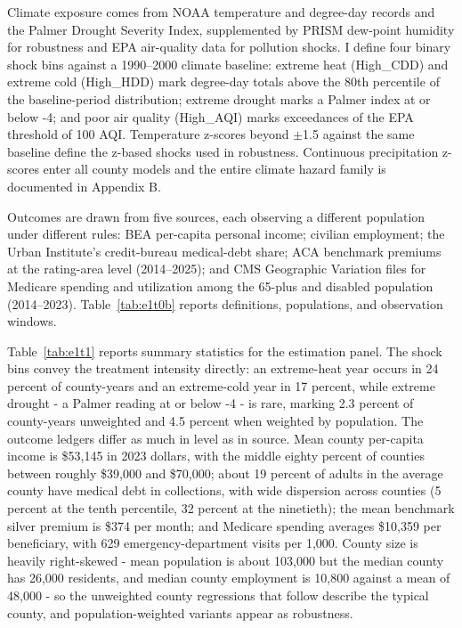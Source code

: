 \documentclass[a4paper,11pt]{article}
\begin{document}


Climate exposure comes from NOAA temperature and degree-day records and the Palmer Drought Severity Index, supplemented by PRISM dew-point humidity for robustness and EPA air-quality data for pollution shocks. I define four binary shock bins against a 1990--2000 climate baseline: extreme heat (High\_CDD) and extreme cold (High\_HDD) mark degree-day totals above the 80th percentile of the baseline-period distribution; extreme drought marks a Palmer index at or below -4; and poor air quality (High\_AQI) marks exceedances of the EPA threshold of 100 AQI. Temperature z-scores beyond $\pm$1.5 against the same baseline define the z-based shocks used in robustness. Continuous precipitation z-scores enter all county models and the entire climate hazard family is documented in Appendix B.

Outcomes are drawn from five sources, each observing a different population under different rules: BEA per-capita personal income; civilian employment; the Urban Institute's credit-bureau medical-debt share; ACA benchmark premiums at the rating-area level (2014--2025); and CMS Geographic Variation files for Medicare spending and utilization among the 65-plus and disabled population (2014--2023). Table~\ref{tab:e1t0b} reports definitions, populations, and observation windows.



Table~\ref{tab:e1t1} reports summary statistics for the estimation panel. The shock bins convey the treatment intensity directly: an extreme-heat year occurs in 24 percent of county-years and an extreme-cold year in 17 percent, while extreme drought - a Palmer reading at or below -4 - is rare, marking 2.3 percent of county-years unweighted and 4.5 percent when weighted by population. The outcome ledgers differ as much in level as in source. Mean county per-capita income is \$53,145 in 2023 dollars, with the middle eighty percent of counties between roughly \$39,000 and \$70,000; about 19 percent of adults in the average county have medical debt in collections, with wide dispersion across counties (5 percent at the tenth percentile, 32 percent at the ninetieth); the mean benchmark silver premium is \$374 per month; and Medicare spending averages \$10,359 per beneficiary, with 629 emergency-department visits per 1,000. County size is heavily right-skewed - mean population is about 103,000 but the median county has 26,000 residents, and median county employment is 10,800 against a mean of 48,000 - so the unweighted county regressions that follow describe the typical county, and population-weighted variants appear as robustness.
\end{document}
